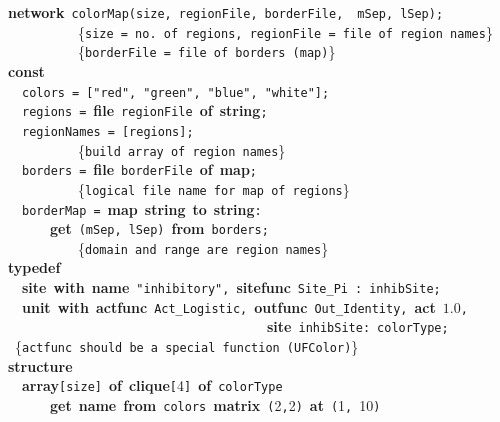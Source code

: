 {\bf network}~\verb&colorMap&\verb&(&\verb&size&\verb&,&~\verb&regionFile&\verb&,&~\verb&borderFile&\verb&,&~~\verb&mSep&\verb&,&~\verb&lSep&\verb&)&\verb&;&\\
~~~~~~~~~~{\small \{\verb{size = no. of regions, regionFile = file of region names{\}}\\
~~~~~~~~~~{\small \{\verb{borderFile = file of borders (map){\}}\\[.15cm]
{\bf const}\\
~~\verb&colors&~\verb&=&~\verb&[&\verb&"red"&\verb&,&~\verb&"green"&\verb&,&~\verb&"blue"&\verb&,&~\verb&"white"&\verb&]&\verb&;&\\
~~\verb&regions&~\verb&=&~{\bf file}~\verb&regionFile&~{\bf of}~{\bf string}\verb&;&\\
~~\verb&regionNames&~\verb&=&~\verb&[&\verb&regions&\verb&]&\verb&;&~~~~~\\
~~~~~~~~~~{\small \{\verb{build array of region names{\}}\\
~~\verb&borders&~\verb&=&~{\bf file}~\verb&borderFile&~{\bf of}~{\bf map}\verb&;&\\
~~~~~~~~~~{\small \{\verb{logical file name for map of regions{\}}\\
~~\verb&borderMap&~\verb&=&~{\bf map}~{\bf string}~{\bf to}~{\bf string}\verb&:&\\
~~~~~~{\bf get}~\verb&(&\verb&mSep&\verb&,&~\verb&lSep&\verb&)&~{\bf from}~\verb&borders&\verb&;&\\
~~~~~~~~~~{\small \{\verb{domain and range are region names{\}}\\[.15cm]
{\bf typedef}\\
~~{\bf site}~{\bf with}~{\bf name}~\verb&"inhibitory"&\verb&,&~{\bf sitefunc}~\verb&Site_Pi&~\verb&:&~\verb&inhibSite&\verb&;&\\
~~{\bf unit}~{\bf with}~{\bf actfunc}~\verb&Act_Logistic&\verb&,&~{\bf outfunc}~\verb&Out_Identity&\verb&,&~{\bf act}~$1.0$\verb&,&~\\
~~~~~~~~~~~~~~~~~~~~~~~~~~~~~~~~~~~~~{\bf site}~\verb&inhibSite&\verb&:&~\verb&colorType&\verb&;&\\
~{\small \{\verb{actfunc should be a special function (UFColor){\}}\\[.15cm]
{\bf structure}\\
~~{\bf array}\verb&[&\verb&size&\verb&]&~{\bf of}~{\bf clique}\verb&[&4\verb&]&~{\bf of}~\verb&colorType&~~\\
~~~~~~{\bf get}~{\bf name}~{\bf from}~\verb&colors&~{\bf matrix}~\verb&(&2\verb&,&2\verb&)&~{\bf at}~\verb&(&1\verb&,&~10\verb&)&\\
